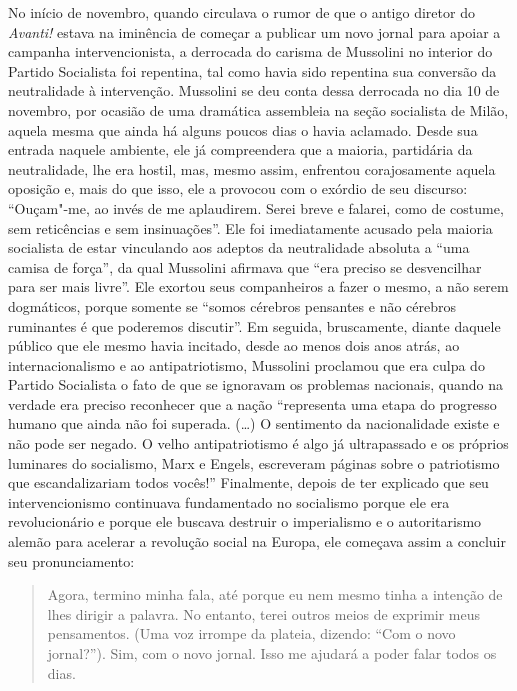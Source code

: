 No início de novembro, quando circulava o rumor de que o antigo diretor
do \emph{Avanti!} estava na iminência de começar a publicar um novo
jornal para apoiar a campanha intervencionista, a derrocada do carisma
de Mussolini no interior do Partido Socialista foi repentina, tal como
havia sido repentina sua conversão da neutralidade à intervenção.
Mussolini se deu conta dessa derrocada no dia 10 de novembro, por
ocasião de uma dramática assembleia na seção socialista de Milão, aquela
mesma que ainda há alguns poucos dias o havia aclamado. Desde sua
entrada naquele ambiente, ele já compreendera que a maioria, partidária
da neutralidade, lhe era hostil, mas, mesmo assim, enfrentou
corajosamente aquela oposição e, mais do que isso, ele a provocou com o
exórdio de seu discurso: ``Ouçam"-me, ao invés de me aplaudirem. Serei
breve e falarei, como de costume, sem reticências e sem insinuações''.
Ele foi imediatamente acusado pela maioria socialista de estar
vinculando aos adeptos da neutralidade absoluta a ``uma camisa de
força'', da qual Mussolini afirmava que ``era preciso se desvencilhar
para ser mais livre''. Ele exortou seus companheiros a fazer o mesmo, a
não serem dogmáticos, porque somente se ``somos cérebros pensantes e não
cérebros ruminantes é que poderemos discutir''. Em seguida, bruscamente,
diante daquele público que ele mesmo havia incitado, desde ao menos dois
anos atrás, ao internacionalismo e ao antipatriotismo, Mussolini
proclamou que era culpa do Partido Socialista o fato de que se ignoravam
os problemas nacionais, quando na verdade era preciso reconhecer que a
nação ``representa uma etapa do progresso humano que ainda não foi
superada. (\ldots{}) O sentimento da nacionalidade existe e não pode ser
negado. O velho antipatriotismo é algo já ultrapassado e os próprios
luminares do socialismo, Marx e Engels, escreveram páginas sobre o
patriotismo que escandalizariam todos vocês!'' Finalmente, depois de ter
explicado que seu intervencionismo continuava fundamentado no socialismo
porque ele era revolucionário e porque ele buscava destruir o
imperialismo e o autoritarismo alemão para acelerar a revolução social
na Europa, ele começava assim a concluir seu pronunciamento:

\begin{quote}
Agora, termino minha fala, até porque eu nem mesmo tinha a intenção de
lhes dirigir a palavra. No entanto, terei outros meios de exprimir meus
pensamentos. (Uma voz irrompe da plateia, dizendo: ``Com o novo
jornal?''). Sim, com o novo jornal. Isso me ajudará a poder falar todos
os dias.
\end{quote}

